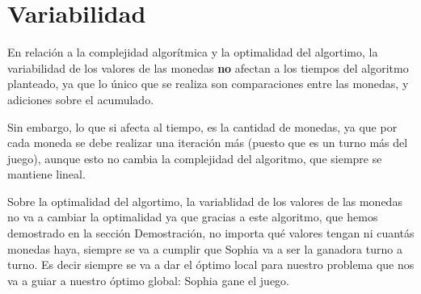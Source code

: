 \section{Variabilidad}

 En relación a la complejidad algorítmica y la optimalidad del algortimo, la variabilidad de los valores de las monedas \textbf{no} afectan a los tiempos del algoritmo planteado, ya que lo único que se realiza son comparaciones entre las monedas, y adiciones sobre el acumulado.

 Sin embargo, lo que si afecta al tiempo, es la cantidad de monedas, ya que por cada moneda se debe realizar una iteración más (puesto que es un turno más del juego), aunque esto no cambia la complejidad del algoritmo, que siempre se mantiene lineal.
 
 Sobre la optimalidad del algortimo, la variablidad de los valores de las monedas no va a cambiar la optimalidad ya que gracias a este algoritmo, que hemos demostrado en la sección Demostración, no importa qué valores tengan ni cuantás monedas haya, siempre se va a cumplir que Sophia va a ser la ganadora turno a turno. Es decir siempre se va a dar el óptimo local para nuestro problema que nos va a guiar a nuestro óptimo global: Sophia gane el juego.





